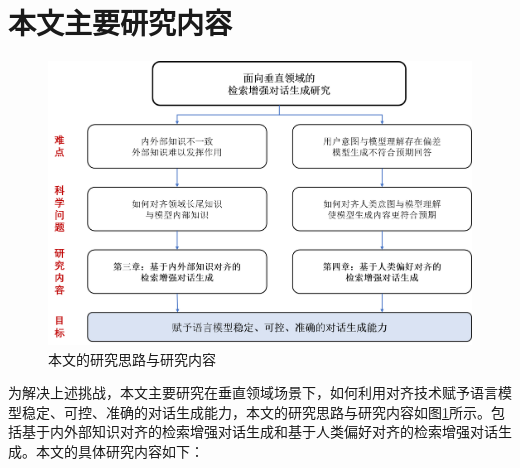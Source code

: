 \section{本文主要研究内容}

\begin{figure}[htbp]
	\centering
	\includegraphics[scale=0.55]{Fig/paper_structure.png}
	\caption{\label{research_idea_and_research_content_of_this_paper}本文的研究思路与研究内容}
\end{figure}

为解决上述挑战，本文主要研究在垂直领域场景下，如何利用对齐技术赋予语言模型稳定、可控、准确的对话生成能力，本文的研究思路与研究内容如图\ref{research_idea_and_research_content_of_this_paper}所示。包括基于内外部知识对齐的检索增强对话生成和基于人类偏好对齐的检索增强对话生成。本文的具体研究内容如下：

